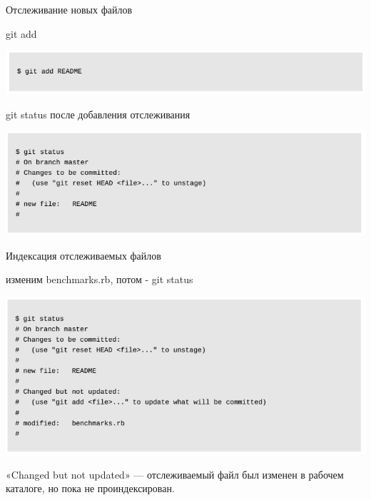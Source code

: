 \documentclass{beamer}
\begin{document}
\begin{frame}{Отслеживание новых файлов}
\begin{block}{git add}
\begin{center}
\includegraphics[scale=0.5]{images/git-add-1.png}
\end{center}
\end{block}
\begin{block}{git status после добавления отслеживания}
\begin{center}
\includegraphics[scale=0.5]{images/git-add-2.png}
\end{center}
\end{block}
\end{frame}

\begin{frame}{Индексация отслеживаемых файлов}
\begin{block}{изменим benchmarks.rb, потом - git status}
\begin{center}
\includegraphics[scale=0.5]{images/git-index-1.png}
\end{center}
\end{block}
«Changed but not updated» — отслеживаемый файл был изменен в рабочем каталоге, но пока не проиндексирован. 
\end{frame}
\end{document}
